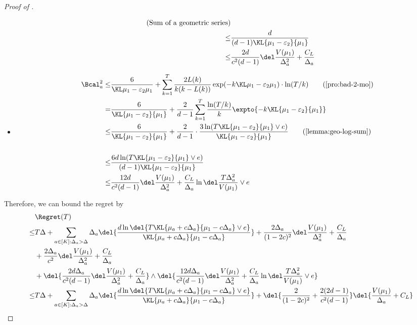 \begin{proof}[Proof of ]
\begin{itemize}
\begin{align*}
                \tag{Sum of a geometric series}
            \\
            \leq&
                \frac{d}{(d-1)\KL{\mu_1 - \varepsilon_2}{\mu_1}}
            \\
            \leq&
                \frac{2d}{c^2 (d-1)} \CommonFactorInRegretBound
        \end{align*}
        \item
        \begin{align*}
            \Bcal_a^2
            \leq& \ExpFThreeMO
                \tag{\Cref{pro:bad-2-mo}}
            \\
            =&
            \frac{6}{\KL{\mu_1 - \varepsilon_2}{\mu_1}} 
            + \frac{2}{d-1} \sum_{k=1}^T \frac{\ln(T/k)}{k} \expto{-k \KL{\mu_1 - \varepsilon_2}{\mu_1}}
            \\
            \leq&
            \frac{6}{\KL{\mu_1 - \varepsilon_2}{\mu_1}} 
            + \frac{2}{d-1} \cdot \frac{3\ln(T\KL{\mu_1-\varepsilon_2}{\mu_1} \vee e)}{\KL{\mu_1-\varepsilon_2}{\mu_1}} 
                    \tag{\Cref{lemma:geo-log-sum}} \\
            \\
            \leq&
                \frac{6d\ln(T\KL{\mu_1-\varepsilon_2}{\mu_1} \vee e)}{(d-1)\KL{\mu_1-\varepsilon_2}{\mu_1}}
            \\
            \leq&
                \frac{12d}{c^2(d-1)} \CommonFactorInRegretBound \LogFactorInRegretBound
        \end{align*}
    \end{itemize}

    
        
    Therefore, we can bound the regret by
    \begin{align*}
        &\Regret(T) \\
        \leq&
        T \Delta 
        + \sum_{a\in[K]: \Delta_a > \Delta} \Delta_a \del{\frac{d\ln\del{T\KL{\mu_a+c\Delta_a}{\mu_1-c\Delta_a} \vee e}}{\KL{\mu_a+c\Delta_a}{\mu_1-c\Delta_a}}} +
        \frac{2\Delta_a}{(1-2c)^2}\CommonFactorInRegretBound
        \\
        &+
        \frac{2\Delta_a}{c^2} \CommonFactorInRegretBound
        \\
        &+
        \del{\frac{2d\Delta_a}{c^2(d-1)} \CommonFactorInRegretBound} \wedge \del{\frac{12d\Delta_a}{c^2(d-1)} \CommonFactorInRegretBound \LogFactorInRegretBound}
        \\
        \leq&
        T \Delta 
        + \sum_{a\in[K]: \Delta_a > \Delta} \Delta_a \del{\frac{d\ln\del{T\KL{\mu_a+c\Delta_a}{\mu_1-c\Delta_a} \vee e}}{\KL{\mu_a+c\Delta_a}{\mu_1-c\Delta_a}}}
        + 
        \del{\frac{2}{(1-2c)^2} + \frac{2(2d-1)}{c^2(d-1)}} \del{\frac{V(\mu_1)}{\Delta_a} + C_L} 
    \end{align*}
\end{proof}

